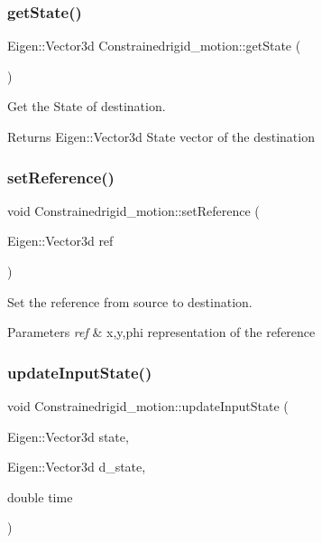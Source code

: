 \subsubsection{\texorpdfstring{get\+State()}{getState()}}
{\footnotesize\ttfamily Eigen\+::\+Vector3d Constrainedrigid\+\_\+motion\+::get\+State (\begin{DoxyParamCaption}{ }\end{DoxyParamCaption})}



Get the State of destination. 

\begin{DoxyReturn}{Returns}
Eigen\+::\+Vector3d State vector of the destination 
\end{DoxyReturn}
\mbox{\label{group__RigidMotion_ga2cc2728f1d7865deea62a7fe540eee1a}} 
\subsubsection{\texorpdfstring{set\+Reference()}{setReference()}}
{\footnotesize\ttfamily void Constrainedrigid\+\_\+motion\+::set\+Reference (\begin{DoxyParamCaption}\item[{Eigen\+::\+Vector3d}]{ref }\end{DoxyParamCaption})}



Set the reference from source to destination. 


\begin{DoxyParams}{Parameters}
{\em ref} & x,y,phi representation of the reference \\
\hline
\end{DoxyParams}
\mbox{\label{group__RigidMotion_ga67803463eb8fcb37eec415292fa6a13f}} 
\subsubsection{\texorpdfstring{update\+Input\+State()}{updateInputState()}}
{\footnotesize\ttfamily void Constrainedrigid\+\_\+motion\+::update\+Input\+State (\begin{DoxyParamCaption}\item[{Eigen\+::\+Vector3d}]{state,  }\item[{Eigen\+::\+Vector3d}]{d\+\_\+state,  }\item[{double}]{time }\end{DoxyParamCaption})}




